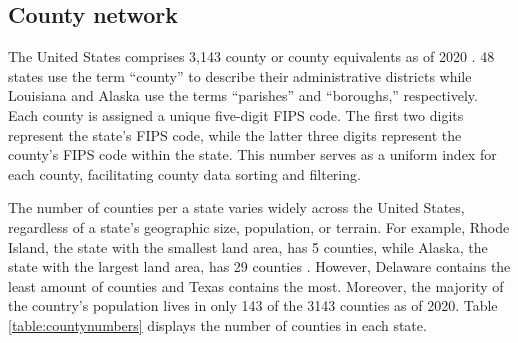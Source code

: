 \subsection{County network}

The United States comprises 3,143 county or county equivalents as of 2020 \cite{USCB:2020a}. 48 states use the term ``county'' to describe their administrative districts while Louisiana and Alaska use the terms ``parishes'' and ``boroughs,'' respectively. Each county is assigned a unique five-digit {FIPS} code. The first two digits represent the state's {FIPS} code, while the latter three digits represent the county's {FIPS} code within the state. This number serves as a uniform index for each county, facilitating county data sorting and filtering. 

The number of counties per a state varies widely across the United States, regardless of a state's geographic size, population, or terrain. For example, Rhode Island, the state with the smallest land area, has 5 counties, while Alaska, the state with the largest land area, has 29 counties \cite{USCB:2020b}. However, Delaware contains the least amount of counties and Texas contains the most. Moreover, the majority of the country's population lives in only 143 of the 3143 counties as of 2020. Table \ref{table:countynumbers} displays the number of counties in each state. 


